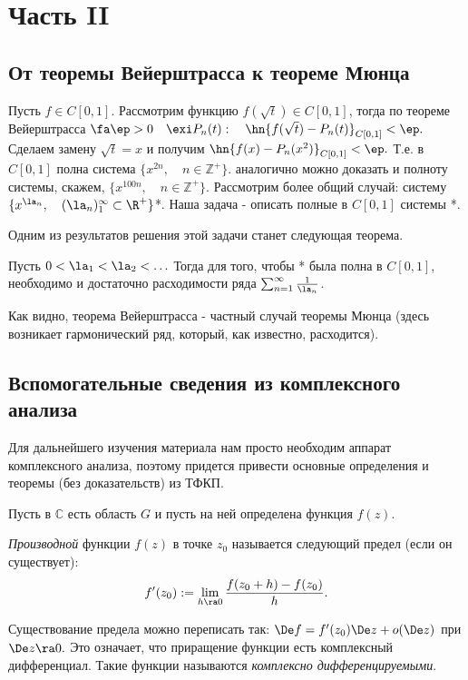 \documentclass{article}
\begin{document}
\newpage
\section{Часть II}
\subsection{От теоремы Вейерштрасса к теореме Мюнца}
Пусть $f\in C[0,1]$. Рассмотрим функцию $f(\sqrt{t})\in C[0,1]$, тогда по теореме Вейерштрасса
$\fa\ep>0\quad\exi P_n(t):\quad\hn{f(\sqrt{t})-P_n(t)}_{C[0,1]}<\ep.$ Сделаем замену
$\sqrt{t}=x$ и получим $\hn{f(x)-P_n(x^2)}_{C[0,1]}<\ep.$ Т.е. в $C[0,1]$ полна система
$\{x^{2n},\quad n\in\mathbb{Z}^{+}\}$. аналогично можно доказать и полноту системы, скажем, $\{x^{100n},\quad
n\in\mathbb{Z}^{+}\}$. Рассмотрим более общий случай: систему
$\{x^{\la_n},\quad(\la_n)_1^{\infty}\subset\R ^{+}\}$*. Наша задача - описать полные в
$C[0,1]$ системы *.

Одним из результатов решения этой задачи станет следующая теорема.
\begin{theorem}[Мюнц 1914г.]
Пусть $0<\la_1<\la_2<\ldots$ Тогда для того, чтобы * была
полна в $C[0,1]$, необходимо и достаточно расходимости ряда
$\sum_{n=1}^{\infty}\frac1{\la_n}$.
\end{theorem}
Как видно, теорема Вейерштрасса - частный случай теоремы Мюнца
(здесь возникает гармонический ряд, который, как известно,
расходится).

\subsection{Вспомогательные сведения из комплексного анализа}
Для дальнейшего изучения материала нам просто необходим аппарат комплексного анализа, поэтому придется
привести основные определения и теоремы (без доказательств) из ТФКП.

Пусть в $\mathbb{C}$ есть область $G$ и пусть на ней определена
функция $f(z)$.

\begin{df}
  \emph{Производной} функции $f(z)$ в точке
  $z_0$ называется следующий предел (если он существует):
  $$f'(z_0):=\lim_{h\ra0}\frac{f(z_0+h)-f(z_0)}{h}.$$
\end{df}

Существование предела можно переписать так: $\De
f=f'(z_0)\De z+o(\De z)$ при $\De z\ra0.$ Это
означает, что приращение функции есть комплексный дифференциал.
Такие функции называются \emph{комплексно дифференцируемыми}.
\end{document}
